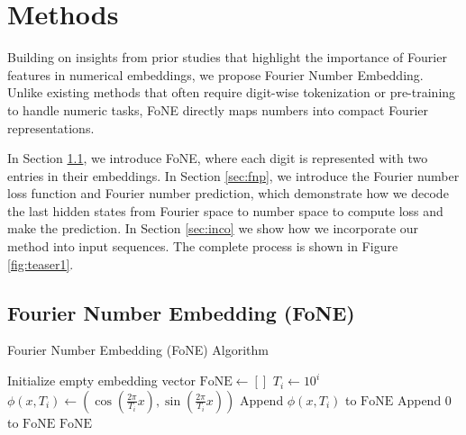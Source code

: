 

\section{Methods}

Building on insights from prior studies 
\cite{zhou2024pre} that highlight the importance of Fourier features in numerical embeddings, we propose Fourier Number Embedding. Unlike existing methods that often require digit-wise tokenization or pre-training to handle numeric tasks, FoNE directly maps numbers into compact Fourier representations.


In Section \ref{sec:fne}, we introduce FoNE, where each digit is represented with two entries in their embeddings. In Section \ref{sec:fnp}, we introduce the Fourier number loss function and Fourier number prediction, which demonstrate how we decode the last hidden states from Fourier space to number space to compute loss and make the prediction. In Section \ref{sec:inco} we show how we incorporate our method into input sequences. The complete process is shown in Figure \ref{fig:teaser1}. 



\subsection{Fourier Number Embedding (FoNE)}\label{sec:fne}
\ifdefined\isarxiv

\begin{algorithm*}[!ht]
\caption{Fourier Number Embedding (FoNE) Algorithm}\label{alg:fne_algorithm_fixed}
    \begin{algorithmic}[1]
    \State Initialize empty embedding vector $\text{FoNE} \gets []$
     
        \State $T_i \gets 10^i$ 
        \State $\phi(x, T_i) \gets (\cos(\tfrac{2\pi}{T_i} x), \sin(\tfrac{2\pi}{T_i} x))$ 
        \State Append $\phi(x, T_i)$ to $\text{FoNE}$ 
    \EndFor
     
        \State Append $0$ to $\text{FoNE}$ 
    \EndWhile
    \State \Return $\text{FoNE}$ 
    \EndProcedure
    \end{algorithmic}
\end{algorithm*}
\else
\fi

